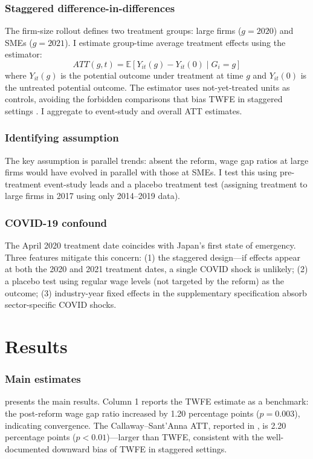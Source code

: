\documentclass[12pt]{article}
\begin{document}
\subsubsection*{Staggered difference-in-differences} The firm-size rollout defines two treatment groups: large firms ($g = 2020$) and SMEs ($g = 2021$). I estimate group-time average treatment effects using the \citet{callaway2021difference} estimator:
\begin{equation}
ATT(g,t) = \mathbb{E}[Y_{it}(g) - Y_{it}(0) \mid G_i = g]
\end{equation}
where $Y_{it}(g)$ is the potential outcome under treatment at time $g$ and $Y_{it}(0)$ is the untreated potential outcome. The estimator uses not-yet-treated units as controls, avoiding the forbidden comparisons that bias TWFE in staggered settings \citep{goodman2021difference}. I aggregate to event-study and overall ATT estimates.

\subsubsection*{Identifying assumption} The key assumption is parallel trends: absent the reform, wage gap ratios at large firms would have evolved in parallel with those at SMEs. I test this using pre-treatment event-study leads and a placebo treatment test (assigning treatment to large firms in 2017 using only 2014--2019 data).

\subsubsection*{COVID-19 confound} The April 2020 treatment date coincides with Japan's first state of emergency. Three features mitigate this concern: (1) the staggered design---if effects appear at both the 2020 and 2021 treatment dates, a single COVID shock is unlikely; (2) a placebo test using regular wage levels (not targeted by the reform) as the outcome; (3) industry-year fixed effects in the supplementary specification absorb sector-specific COVID shocks.

\section{Results}

\subsubsection*{Main estimates}  presents the main results. Column 1 reports the TWFE estimate as a benchmark: the post-reform wage gap ratio increased by 1.20 percentage points ($p = 0.003$), indicating convergence. The Callaway--Sant'Anna ATT, reported in , is 2.20 percentage points ($p < 0.01$)---larger than TWFE, consistent with the well-documented downward bias of TWFE in staggered settings.
\end{document}
